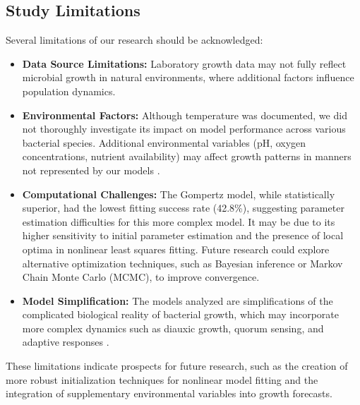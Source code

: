 \documentclass[11pt]{article}
\begin{document}
\subsection{Study Limitations}
Several limitations of our research should be acknowledged:

\begin{itemize}
    \item \textbf{Data Source Limitations:} Laboratory growth data may not fully reflect microbial growth in natural environments, where additional factors influence population dynamics.
    \item \textbf{Environmental Factors:} Although temperature was documented, we did not thoroughly investigate its impact on model performance across various bacterial species. Additional environmental variables (pH, oxygen concentrations, nutrient availability) may affect growth patterns in manners not represented by our models \citep{Huber2017}.
    \item \textbf{Computational Challenges:} The Gompertz model, while statistically superior, had the lowest fitting success rate (42.8\%), suggesting parameter estimation difficulties for this more complex model. It may be due to its higher sensitivity to initial parameter estimation and the presence of local optima in nonlinear least squares fitting. Future research could explore alternative optimization techniques, such as Bayesian inference or Markov Chain Monte Carlo (MCMC), to improve convergence.
    \item \textbf{Model Simplification:} The models analyzed are simplifications of the complicated biological reality of bacterial growth, which may incorporate more complex dynamics such as diauxic growth, quorum sensing, and adaptive responses \citep{Ivanova2015}.
\end{itemize}

These limitations indicate prospects for future research, such as the creation of more robust initialization techniques for nonlinear model fitting and the integration of supplementary environmental variables into growth forecasts.




\end{document}
